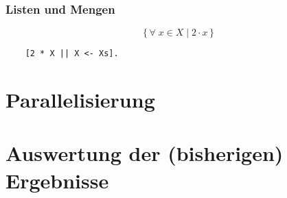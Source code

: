 \documentclass[compress]{beamer}
\begin{document}
\begin{frame}[fragile]
  \frametitle{Listen und Mengen}
  $$ \{\,\forall\; x \in X \mid 2 \cdot x\,\}$$

  \vfill

  \begin{lstlisting}
    [2 * X || X <- Xs].
  \end{lstlisting}
\end{frame}
\section{Parallelisierung}
\label{sec:parallelisierung}

\section{Auswertung der (bisherigen) Ergebnisse}
\label{sec:auswertung}
\end{document}
